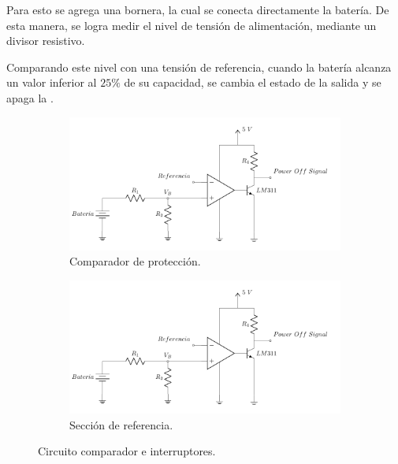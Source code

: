 Para esto se agrega una bornera, la cual se conecta directamente la batería. De esta manera, se logra medir el nivel de tensión de alimentación, mediante un divisor resistivo.

Comparando este nivel con una tensión de referencia, cuando la batería alcanza un valor inferior al $25\%$ de su capacidad, se cambia el estado de la salida y se apaga la \rspi.
\begin{figure}[H]
\centering
	\begin{subfigure}{0.7\textwidth}
    	\centering
        \includegraphics[width=\linewidth, page=1]{ImagenesIngenieria de Detalle/CircuitoProteccion}		
		\caption{Comparador de protección.}
	\end{subfigure}      
        
    \begin{subfigure}{0.5\textwidth}
    	\centering
        \includegraphics[width=\linewidth, page=2]{ImagenesIngenieria de Detalle/CircuitoProteccion}				\caption{Sección de referencia.}
    \end{subfigure}
	\caption{Circuito comparador e interruptores.}
	\label{fig:Comp}
\end{figure}

